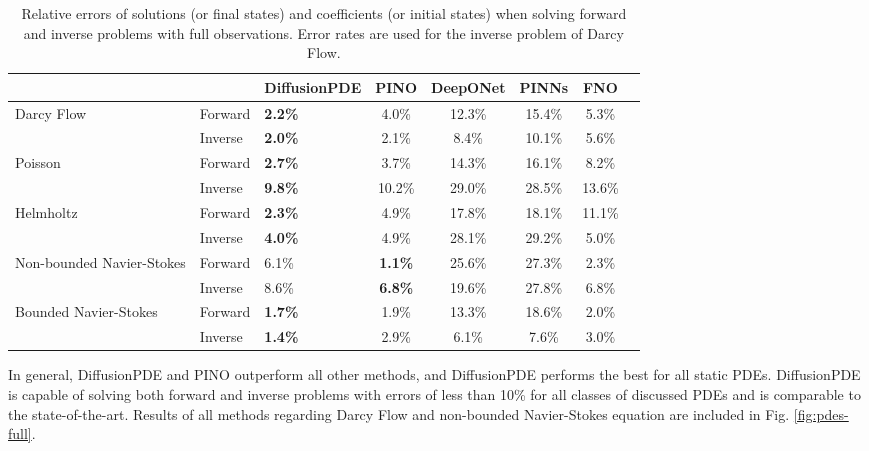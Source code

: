 \begin{table}[H]
    \vspace{-1em}
    \caption{Relative errors of solutions (or final states) and coefficients (or initial states) when solving forward and inverse problems with full observations. Error rates are used for the inverse problem of Darcy Flow.}
    \label{table:merged_results_full}
    \centering
    \begin{tabular}{p{2cm}llccccc}
        \toprule
        & & DiffusionPDE & PINO & DeepONet & PINNs & FNO \\
        \midrule
        \multirow{2}{2cm}{Darcy Flow} & Forward & \textbf{2.2\%} & 4.0\% & 12.3\% & 15.4\% & 5.3\% \\
        & Inverse & \textbf{2.0\%} & 2.1\% & 8.4\% & 10.1\% & 5.6\% \\
        \midrule
        \multirow{2}{2cm}{Poisson} & Forward & \textbf{2.7\%} & 3.7\% & 14.3\% & 16.1\% & 8.2\% \\
        & Inverse & \textbf{9.8\%} & 10.2\% & 29.0\% & 28.5\% & 13.6\% \\
        \midrule
        \multirow{2}{2cm}{Helmholtz} & Forward & \textbf{2.3\%} & 4.9\% & 17.8\% & 18.1\% & 11.1\% \\
        & Inverse & \textbf{4.0\%} & 4.9\% & 28.1\% & 29.2\% & 5.0\% \\
        \midrule
        \multirow{2}{2cm}{Non-bounded Navier-Stokes} & Forward & 6.1\% & \textbf{1.1\%} & 25.6\% & 27.3\% & 2.3\% \\
        & Inverse & 8.6\% & \textbf{6.8\%} & 19.6\% & 27.8\% & 6.8\% \\
        \midrule
        \multirow{2}{2cm}{Bounded Navier-Stokes} & Forward & \textbf{1.7\%} & 1.9\% & 13.3\% & 18.6\% & 2.0\% \\
        & Inverse & \textbf{1.4\%} & 2.9\% & 6.1\% & 7.6\% & 3.0\% \\
        \bottomrule
    \end{tabular}
\end{table}



 In general, DiffusionPDE and PINO outperform all other methods, and DiffusionPDE performs the best for all static PDEs. DiffusionPDE is capable of solving both forward and inverse problems with errors of less than 10\% for all classes of discussed PDEs and is comparable to the state-of-the-art. Results of all methods regarding Darcy Flow and non-bounded Navier-Stokes equation are included in Fig. \ref{fig:pdes-full}.

